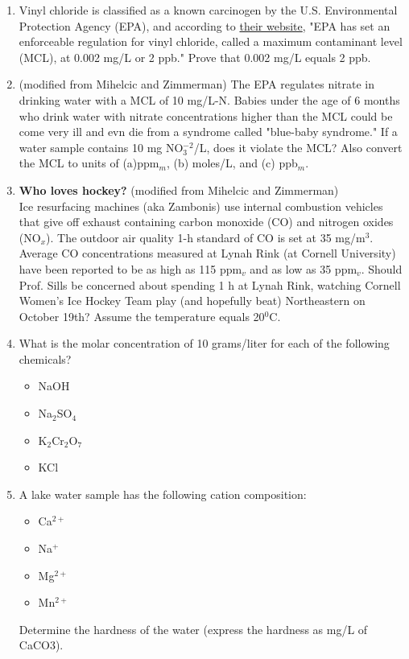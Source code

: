 \documentclass[12pt,letterpaper]{article}
\begin{document}
\begin{enumerate}
\item Vinyl chloride is classified as a known carcinogen by the U.S. Environmental Protection Agency (EPA), and according to \href{http://water.epa.gov/drink/contaminants/basicinformation/vinyl-chloride.cfm}{their website}, "EPA has set an enforceable regulation for vinyl chloride, called a maximum contaminant level (MCL), at 0.002 mg/L or 2 ppb."  Prove that 0.002 mg/L equals 2 ppb. 

\item (modified from Mihelcic and Zimmerman) The EPA regulates nitrate in drinking water with a MCL of 10 mg/L-N.  Babies under the age of 6 months who drink water with nitrate concentrations higher than the MCL could be come very ill and evn die from a syndrome called "blue-baby syndrome."  If a water sample contains 10 mg NO$_3^{-2}$/L, does it violate the MCL?  Also convert the MCL to units of (a)ppm$_m$, (b) moles/L, and (c) ppb$_m$. 




\item \textbf{Who loves hockey?} (modified from Mihelcic and Zimmerman)\\
Ice resurfacing machines (aka Zambonis) use internal combustion vehicles that give off exhaust containing carbon monoxide (CO) and nitrogen oxides (NO$_x$).  The outdoor air quality 1-h standard of CO is set at 35 mg/m$^3$. Average CO concentrations measured at Lynah Rink (at Cornell University) have been reported to be as high as 115 ppm$_v$ and as low as 35 ppm$_v$.  Should Prof. Sills be concerned about spending 1 h at Lynah Rink, watching Cornell Women's Ice Hockey Team play (and hopefully beat) Northeastern on October 19th?  Assume the temperature equals 20$^0$C. 

\item What is the molar concentration of 10 grams/liter for each of the following chemicals?
\begin{itemize}
\item NaOH     
\item Na$_2$SO$_4$   
\item K$_2$Cr$_2$O$_7$   
\item KCl  
\end{itemize}

\item A lake water sample has the following cation composition:
\begin{itemize}
\item Ca$^{2+}$
\item Na$^{+}$
\item Mg$^{2+}$
\item Mn$^{2+}$
\end{itemize}
Determine the hardness of the water (express the hardness as mg/L of CaCO3).
 

\end{enumerate}
\end{document}
